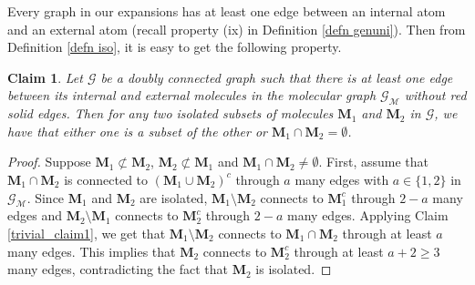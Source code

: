 \documentclass{article}
\newcommand{\1}{\mathds{1}}
\numberwithin{equation}{section}
\renewcommand{\cal}{\mathcal}
\renewcommand{\geq}{\geqslant}
\renewcommand{\ge}{\geq}
\theoremstyle{plain} %
\newtheorem{claim}[theorem]{Claim}
\theoremstyle{remark}
\newcommand{\Pol}{{\mathbf{M}}}
\begin{document}
Every graph in our expansions has at least one edge between an internal atom and an external atom (recall property (ix) in Definition \ref{defn genuni}). Then from Definition \ref{defn iso}, it is easy to get the following property. 

\begin{claim}\label{trivial_claim2}
Let $\cal G$ be a doubly connected graph such that there is at least one edge between its internal and external molecules in the molecular graph $\cal G_{\cal M}$ without red solid edges. Then for any two isolated subsets of molecules $\Pol_1$ and $\Pol_2$ in $\cal G$, we have that either one is a subset of the other or $\Pol_1\cap \Pol_2=\emptyset$. 
\end{claim}
\begin{proof}
Suppose $\Pol_1\not\subset\Pol_2 $, $\Pol_2\not\subset \Pol_1$ and $\Pol_1\cap \Pol_2\ne \emptyset$. First, assume that $\Pol_1\cap \Pol_2$ is connected to $(\Pol_1\cup \Pol_2)^c$ through $a$ many edges with $a\in \{1,2\}$ in $\cal G_{\cal M}$. Since $\Pol_1$ and $\Pol_2$ are isolated, $\Pol_1\setminus \Pol_2$ connects to $\Pol_1^c$ through $2-a$ many edges and $\Pol_2\setminus \Pol_1$ connects to $\Pol_2^c$ through $2-a$ many edges. Applying Claim \ref{trivial_claim1}, we get that $\Pol_1\setminus \Pol_2$ connects to $\Pol_1\cap\Pol_2$ through at least $a$ many edges. This implies that $\Pol_2$ connects to $\Pol_2^c$ through at least $a+2\ge 3$ many edges, contradicting the fact that $\Pol_2$ is isolated. 


\end{proof}
\end{document}
